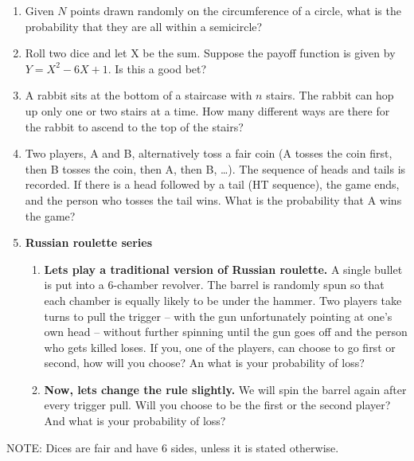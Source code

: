 \documentclass[11pt]{article}
\begin{document}
\begin{enumerate}
\item Given $N$ points drawn randomly on the circumference of a circle, what is the probability that they are all within a semicircle?

\item Roll two dice and let X be the sum. Suppose the payoff function is given by $Y = X^2 - 6X + 1$. Is this a good bet?
\item A rabbit sits at the bottom of a staircase with $n$ stairs. The rabbit can hop up only one or two stairs at a time. How many different ways are there for the rabbit to ascend to the top of the stairs?

\item Two players, A and B, alternatively toss a fair coin (A tosses the coin first, then B tosses the coin, then A, then B, \dots). The sequence of heads and tails is recorded. If there is a head followed by a tail (HT sequence), the game ends, and the person who tosses the tail wins. What is the probability that A wins the game?

\item  \textbf{Russian roulette series}

\begin{enumerate}
    \item \textbf{Lets play a traditional version of Russian roulette.} A single bullet is put into a 6-chamber revolver. The barrel is randomly spun so that each chamber is equally likely to be under the hammer. Two players take turns to pull the trigger -- with the gun unfortunately pointing at one's own head -- without further spinning until the gun goes off and the person who gets killed loses. If you, one of the players, can choose to go first or second, how will you choose? An what is your probability of loss? 
    
    
    \item \textbf{Now, lets change the rule slightly.} We will spin the barrel again after every trigger pull. Will you choose to be the first or the second player? And what is your probability of loss? 
\end{enumerate}
\end{enumerate}


NOTE: Dices are fair and have 6 sides, unless it is stated otherwise. 
\end{document}

